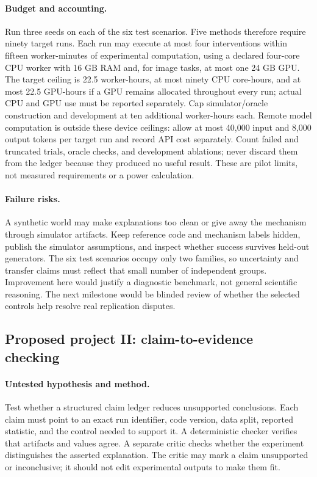 \paragraph{Budget and accounting.}
Run three seeds on each of the six test scenarios. Five methods therefore require ninety target runs. Each run may execute at most four interventions within fifteen worker-minutes of experimental computation, using a declared four-core CPU worker with 16 GB RAM and, for image tasks, at most one 24 GB GPU. The target ceiling is 22.5 worker-hours, at most ninety CPU core-hours, and at most 22.5 GPU-hours if a GPU remains allocated throughout every run; actual CPU and GPU use must be reported separately. Cap simulator/oracle construction and development at ten additional worker-hours each. Remote model computation is outside these device ceilings: allow at most 40,000 input and 8,000 output tokens per target run and record API cost separately. Count failed and truncated trials, oracle checks, and development ablations; never discard them from the ledger because they produced no useful result. These are pilot limits, not measured requirements or a power calculation.

\paragraph{Failure risks.}
A synthetic world may make explanations too clean or give away the mechanism through simulator artifacts. Keep reference code and mechanism labels hidden, publish the simulator assumptions, and inspect whether success survives held-out generators. The six test scenarios occupy only two families, so uncertainty and transfer claims must reflect that small number of independent groups. Improvement here would justify a diagnostic benchmark, not general scientific reasoning. The next milestone would be blinded review of whether the selected controls help resolve real replication disputes.

\subsection{Proposed project II: claim-to-evidence checking}

\paragraph{Untested hypothesis and method.}
Test whether a structured claim ledger reduces unsupported conclusions. Each claim must point to an exact run identifier, code version, data split, reported statistic, and the control needed to support it. A deterministic checker verifies that artifacts and values agree. A separate critic checks whether the experiment distinguishes the asserted explanation. The critic may mark a claim unsupported or inconclusive; it should not edit experimental outputs to make them fit.

